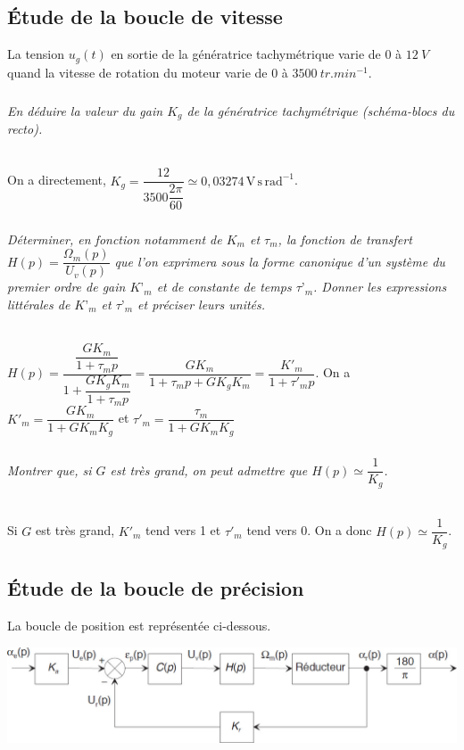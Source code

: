 \documentclass[10pt,fleqn]{article} %
\begin{document}
\begin{multicols}{2}
\subsection*{Étude de la boucle de vitesse}
La tension $u_g(t)$ en sortie de la génératrice tachymétrique varie de 0 à $\SI{12}{V}$ quand la vitesse de 
rotation du moteur varie de 0 à $\SI{3500}{tr.min^{-1}}$.


\subparagraph{}\textit{En déduire la valeur du gain $K_g$ de la génératrice tachymétrique (schéma-blocs du recto).}
\ifprof
\begin{corrige}~\\
On a directement, $K_g = \dfrac{12}{3500\dfrac{2\pi}{60}}\simeq 0,03274\,\text{V}\,\text{s}\,\text{rad}^{-1}$.
\end{corrige}
\else
\fi

\subparagraph{}\textit{Déterminer, en fonction notamment de $K_m$ et $\tau_m$, la fonction de transfert 
$H(p)=\dfrac{\Omega_m(p)}{U_v(p)}$  que l’on exprimera sous la forme canonique d’un système du premier ordre
de gain $K’_m$ et de constante de temps $\tau’_m$. Donner les expressions littérales de $K’_m$ et $\tau’_m$ et
préciser leurs unités. }
\ifprof
\begin{corrige}~\\
$H(p)=\dfrac{\dfrac{GK_m}{1+\tau_m p}}{1+\dfrac{GK_gK_m}{1+\tau_m p}}=\dfrac{GK_m}{1+\tau_mp+{GK_gK_m}}=\dfrac{K'_m}{1+\tau'_m p}$. 
On a $K'_m=\dfrac{GK_m}{1+GK_mK_g}$ et $\tau'_m=\dfrac{\tau_m}{1+GK_mK_g}$
\end{corrige}
\else
\fi

\subparagraph{}\textit{Montrer que, si $G$ est très grand, on peut admettre que $H(p)\simeq \dfrac{1}{K_g}$.}
\ifprof
\begin{corrige}~\\
Si $G$ est très grand, $K'_m$ tend vers 1 et $\tau'_m$ tend vers 0. On a donc $H(p)\simeq \dfrac{1}{K_g}$.
\end{corrige}
\else
\fi
 
\subsection*{Étude de la boucle de précision}
 La boucle de position est représentée ci-dessous. 
 
 \begin{center}
\includegraphics[width=\linewidth]{images/fig_03}
\end{center}


\end{multicols}
\end{document}
